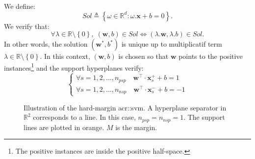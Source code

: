                 We define:
                \begin{equation*}
                    Sol \triangleq \left\{\omega \in \mathbb{R}^d : \omega.\bm{x} + b = 0\right\}.
                \end{equation*}
                We verify that:
                \begin{equation*}
                    \forall \lambda \in \mathbb{R}\setminus\left\{0\right\}, \; (\bm{w}, b) \in  Sol \Leftrightarrow (\lambda . \bm{w}, \lambda.b) \in Sol.
                \end{equation*}
                In other words, the solution $(\bm{w}^*, b^*)$ is unique up to multiplicatif term $\lambda \in \mathbb{R}\setminus\left\{0\right\}$.
                In this context, $(\bm{w}, b)$ is chosen so that \(\bm{w}\) points to the positive instances\footnote{The positive instances are inside the positive half-space.} and the support hyperplanes verify:
                \begin{equation}
                    \label{eq::support_lines}
                    \begin{cases}
                        \forall s=1,2,\dots,n_{psp} \quad \bm{w}^\intercal\cdot\bm{x}^+_s + b = 1\\              
                        \forall s=1,2,\dots,n_{nsp} \quad \bm{w}^\intercal\cdot\bm{x}^-_s + b = -1                
                    \end{cases}
                \end{equation}

                \begin{figure}
                    \centering
                    
                    \caption[
                        Illustration of the hard-margin \acrshort*{acr::svm}.
                    ]{
                        \label{fig::linear_separable} 
                        Illustration of the hard-margin \gls{acr::svm}.
                        A hyperplane separator in $\mathbb{R}^2$ corresponds to a line.
                        In this case, $n_{psp} = n_{nsp} = 1$.
                        The support lines are plotted in orange.
                        $M$ is the margin.
                    }
                \end{figure}

